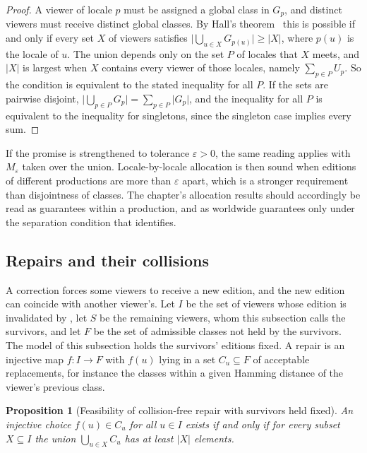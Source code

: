 \documentclass[11pt,twoside,openright]{book}
\theoremstyle{plain}
\newtheorem{proposition}[theorem]{Proposition}
\theoremstyle{definition}
\theoremstyle{remark}
\begin{document}
\begin{proof}
A viewer of locale $p$ must be assigned a global class in $G_p$, and distinct viewers must receive distinct global classes. By Hall's theorem~\cite{hall1935} this is possible if and only if every set $X$ of viewers satisfies $\lvert\bigcup_{u\in X}G_{p(u)}\rvert\ge\lvert X\rvert$, where $p(u)$ is the locale of $u$. The union depends only on the set $P$ of locales that $X$ meets, and $\lvert X\rvert$ is largest when $X$ contains every viewer of those locales, namely $\sum_{p\in P}U_p$. So the condition is equivalent to the stated inequality for all $P$. If the sets are pairwise disjoint, $\lvert\bigcup_{p\in P}G_p\rvert=\sum_{p\in P}\lvert G_p\rvert$, and the inequality for all $P$ is equivalent to the inequality for singletons, since the singleton case implies every sum.
\end{proof}

If the promise is strengthened to tolerance $\varepsilon>0$, the same reading applies with $M_\varepsilon$ taken over the union. Locale-by-locale allocation is then sound when editions of different productions are more than $\varepsilon$ apart, which is a stronger requirement than disjointness of classes. The chapter's allocation results should accordingly be read as guarantees within a production, and as worldwide guarantees only under the separation condition that  identifies.

\subsection{Repairs and their collisions}

A correction forces some viewers to receive a new edition, and the new edition can coincide with another viewer's. Let $I$ be the set of viewers whose edition is invalidated by , let $S$ be the remaining viewers, whom this subsection calls the survivors, and let $F$ be the set of admissible classes not held by the survivors. The model of this subsection holds the survivors' editions fixed. A repair is an injective map $f:I\to F$ with $f(u)$ lying in a set $C_u\subseteq F$ of acceptable replacements, for instance the classes within a given Hamming distance of the viewer's previous class.

\begin{proposition}[Feasibility of collision-free repair with survivors held fixed]\label{prop:hall}
An injective choice $f(u)\in C_u$ for all $u\in I$ exists if and only if for every subset $X\subseteq I$ the union $\bigcup_{u\in X}C_u$ has at least $\lvert X\rvert$ elements.
\end{proposition}
\end{document}
